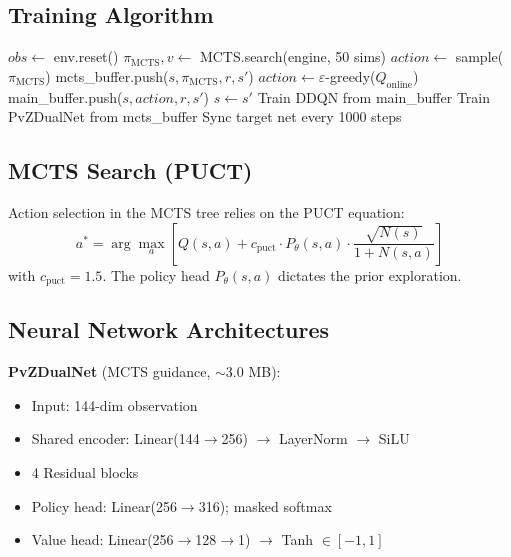 \documentclass[conference]{IEEEtran}
\begin{document}
\subsection{Training Algorithm}
\begin{algorithm}[htbp]
\caption{Hybrid MCTS-DDQN Training}
\label{alg:train}
\begin{algorithmic}[1]
    \STATE $obs \leftarrow$ env.reset()
            \STATE $\pi_{\text{MCTS}}, v \leftarrow$ MCTS.search(engine, 50 sims)
            \STATE $action \leftarrow$ sample($\pi_{\text{MCTS}}$)
            \STATE mcts\_buffer.push($s, \pi_{\text{MCTS}}, r, s'$)
        \ELSE
            \STATE $action \leftarrow \varepsilon$-greedy($Q_{\text{online}}$)
        \ENDIF
        \STATE main\_buffer.push($s, action, r, s'$)
        \STATE $s \leftarrow s'$
    \ENDWHILE
    \STATE Train DDQN from main\_buffer
    \STATE Train PvZDualNet from mcts\_buffer
    \STATE Sync target net every 1000 steps
\ENDFOR
\end{algorithmic}
\end{algorithm}

\subsection{MCTS Search (PUCT)}
Action selection in the MCTS tree relies on the PUCT equation:
\begin{equation}
a^* = \arg\max_a \left[ Q(s,a) + c_{\text{puct}} \cdot P_\theta(s,a) \cdot \frac{\sqrt{N(s)}}{1 + N(s,a)} \right]
\end{equation}
with $c_{\text{puct}}{=}1.5$. The policy head $P_\theta(s,a)$ dictates the prior exploration.

\subsection{Neural Network Architectures}
\textbf{PvZDualNet} (MCTS guidance, $\sim$3.0 MB):
\begin{itemize}[leftmargin=*,nosep]
    \item Input: 144-dim observation
    \item Shared encoder: Linear(144$\to$256) $\to$ LayerNorm $\to$ SiLU
    \item 4 Residual blocks
    \item Policy head: Linear(256$\to$316); masked softmax
    \item Value head: Linear(256$\to$128$\to$1) $\to$ Tanh $\in [-1,1]$
\end{itemize}
\end{document}
